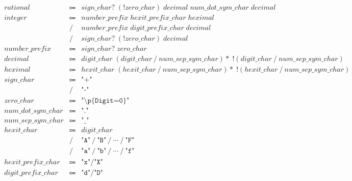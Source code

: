 \begin{align*}
    \begin{array}{rcll}
        \mathit{rational}
        &\Coloneq &\mathit{sign\_char}{?}\; (\mathop{!} \mathit{zero\_char})\; \mathit{decimal}\; \mathit{num\_dot\_sym\_char}\; \mathit{decimal} \\
        \mathit{integer}
        &\Coloneq &\mathit{number\_prefix}\; \mathit{hexit\_prefix\_char}\; \mathit{heximal} \\
        &\mathrel{/} &\mathit{number\_prefix}\; \mathit{digit\_prefix\_char}\; \mathit{decimal} \\
        &\mathrel{/} &\mathit{sign\_char}{?}\; (\mathop{!} \mathit{zero\_char})\; \mathit{decimal} \\
        \mathit{number\_prefix}
        &\Coloneq &\mathit{sign\_char}{?}\; \mathit{zero\_char} \\
        \mathit{decimal}
        &\Coloneq &\mathit{digit\_char}\; (\mathit{digit\_char} \mathrel{/} \mathit{num\_sep\_sym\_char}){*}\; \mathop{!} (\mathit{digit\_char} \mathrel{/} \mathit{num\_sep\_sym\_char}) \\
        \mathit{heximal}
        &\Coloneq &\mathit{hexit\_char}\; (\mathit{hexit\_char} \mathrel{/} \mathit{num\_sep\_sym\_char}){*}\; \mathop{!} (\mathit{hexit\_char} \mathrel{/} \mathit{num\_sep\_sym\_char}) \\
        \mathit{sign\_char}
        &\Coloneq &\texttt{"+"} \\
        &\mathrel{/} &\texttt{"-"} \\
        \mathit{zero\_char}
        &\Coloneq &\texttt{"\textbackslash p\{Digit=0\}"} \\
        \mathit{num\_dot\_sym\_char}
        &\Coloneq &\texttt{"."} \\
        \mathit{num\_sep\_sym\_char}
        &\Coloneq &\texttt{"\_"} \\
        \mathit{hexit\_char}
        &\Coloneq &\mathit{digit\_char} \\
        &\mathrel{/} &\texttt{"A"} \mathrel{/} \texttt{"B"} \mathrel{/} \cdots \mathrel{/} \texttt{"F"} \\
        &\mathrel{/} &\texttt{"a"} \mathrel{/} \texttt{"b"} \mathrel{/} \cdots \mathrel{/} \texttt{"f"} \\
        \mathit{hexit\_prefix\_char}
        &\Coloneq &\texttt{"x"} \mathrel{/} \texttt{"X"} \\
        \mathit{digit\_prefix\_char}
        &\Coloneq &\texttt{"d"} \mathrel{/} \texttt{"D"}
    \end{array}
\end{align*}

